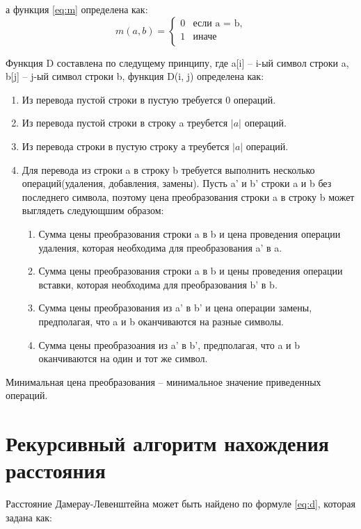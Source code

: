 а функция \ref{eq:m} определена как:
\begin{equation}
    \label{eq:m}
    m(a, b) = \begin{cases}
        0 & \text{если a = b,}\\
        1 & \text{иначе}\\
    \end{cases}
\end{equation}

Функция D составлена по следущему принципу, где a[i] -- i-ый символ строки a,
b[j] -- j-ый символ строки b, функция D(i, j) определена как:
\begin{enumerate}
    \item Из перевода пустой строки в пустую требуется 0 операций.
    \item Из перевода пустой строки в строку a треубется $|a|$ операций.
    \item Из перевода строки в пустую строку а треубется $|a|$ операций.
    \item Для перевода из строки a в строку b требуется выполнить 
    несколько операций(удаления, добавления, замены). Пусть a' и b' строки 
    a и b без последнего символа, поэтому цена преобразования строки a в строку b 
    может выглядеть следующшим образом:
    \begin{enumerate}[label=\alph*)]
        \item Сумма цены преобразования строки a в b и цена проведения операции
        удаления, которая необходима для преобразования a' в a.
        \item Сумма цены преобразования строки a в b и цены проведения операции
        вставки, которая необходима для преобразования b' в b.
        \item Сумма цены преобразования из a' в b' и цена операции замены, 
        предполагая, что a и b оканчиваются на разные символы.
        \item Сумма цены преобразоания из a' в b', предполагая, что a и b оканчиваются 
        на один и тот же символ.
    \end{enumerate}
\end{enumerate}

Минимальная цена преобразования -- минимальное значение приведенных операций.

\section{Рекурсивный алгоритм нахождения расстояния}
Расстояние Дамерау-Левенштейна\cite{distances} может быть найдено по формуле \ref{eq:d}, которая 
задана как:

